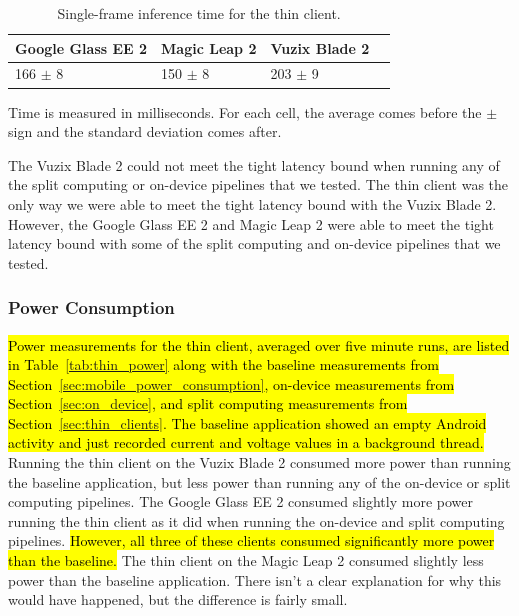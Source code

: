 \begin{table}
\begin{tabular}{|l||l|l|l|}
  \hline
  Google Glass EE 2 & Magic Leap 2 & Vuzix Blade 2\\
  \hline
  \hline
  166 $\pm$ 8 & 150 $\pm$ 8 & 203 $\pm$ 9\\
  \hline
\end{tabular}
\begin{captiontext}
  Time is measured in milliseconds.
  For each cell, the average comes before the $\pm$ sign and the standard
  deviation comes after.
  \end{captiontext}
  \caption{
    Single-frame inference time for the thin client.
  }\label{tab:thin_times}
\end{table}

The Vuzix Blade 2 could not meet the tight latency bound when running any of the
split computing or on-device pipelines that we tested.
The thin client was the only way we were able to meet the tight latency bound
with the Vuzix Blade 2.
However, the Google Glass EE 2 and Magic Leap 2 were able to meet the tight
latency bound with some of the split computing and on-device pipelines that we
tested.

\subsubsection{Power Consumption}

\hl{
Power measurements for the thin client, averaged over five minute runs, are
listed in Table~{\ref{tab:thin_power}} along with the baseline measurements from
Section~{\ref{sec:mobile_power_consumption}},
on-device measurements from Section~{\ref{sec:on_device}},
and split computing measurements from Section~{\ref{sec:thin_clients}}.
The baseline application showed an empty Android activity and just recorded
current and voltage values in a background thread.
}
Running the thin client on the Vuzix Blade 2 consumed more power than running
the baseline application, but less power than running any of the on-device or
split computing pipelines.
The Google Glass EE 2 consumed slightly more power running the thin client
as it did when running the on-device and split computing pipelines.
\hl{
  However, all three of these clients consumed significantly more power than the
  baseline.
}
The thin client on the Magic Leap 2 consumed slightly less power than the
baseline application.
There isn't a clear explanation for why this would have happened, but the
difference is fairly small.

